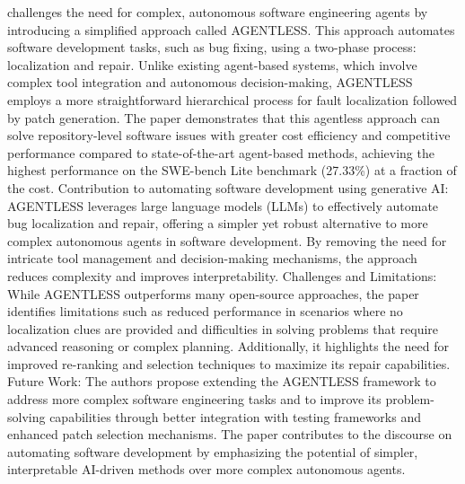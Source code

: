 \citep{xia2024agentless} challenges the need for complex, autonomous software engineering agents by introducing a simplified approach called AGENTLESS. This approach automates software development tasks, such as bug fixing, using a two-phase process: localization and repair. Unlike existing agent-based systems, which involve complex tool integration and autonomous decision-making, AGENTLESS employs a more straightforward hierarchical process for fault localization followed by patch generation. The paper demonstrates that this agentless approach can solve repository-level software issues with greater cost efficiency and competitive performance compared to state-of-the-art agent-based methods, achieving the highest performance on the SWE-bench Lite benchmark (27.33\%) at a fraction of the cost. Contribution to automating software development using generative AI: AGENTLESS leverages large language models (LLMs) to effectively automate bug localization and repair, offering a simpler yet robust alternative to more complex autonomous agents in software development. By removing the need for intricate tool management and decision-making mechanisms, the approach reduces complexity and improves interpretability. Challenges and Limitations: While AGENTLESS outperforms many open-source approaches, the paper identifies limitations such as reduced performance in scenarios where no localization clues are provided and difficulties in solving problems that require advanced reasoning or complex planning. Additionally, it highlights the need for improved re-ranking and selection techniques to maximize its repair capabilities. Future Work: The authors propose extending the AGENTLESS framework to address more complex software engineering tasks and to improve its problem-solving capabilities through better integration with testing frameworks and enhanced patch selection mechanisms. The paper contributes to the discourse on automating software development by emphasizing the potential of simpler, interpretable AI-driven methods over more complex autonomous agents.

